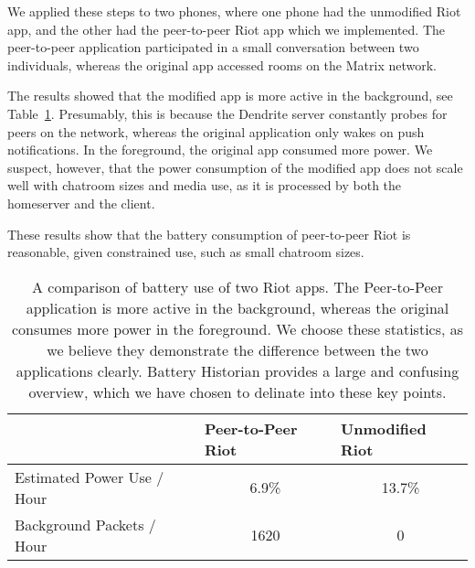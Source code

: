 We applied these steps to two phones, where one phone had the unmodified Riot app, and the other had the peer-to-peer Riot app which we implemented.
The peer-to-peer application participated in a small conversation between two individuals, whereas the original app accessed rooms on the Matrix network.

The results showed that the modified app is more active in the background, see Table~\ref{tab:battery_comparison}.
Presumably, this is because the Dendrite server constantly probes for peers on the network, whereas the original application only wakes on push notifications.
In the foreground, the original app consumed more power.
We suspect, however, that the power consumption of the modified app does not scale well with chatroom sizes and media use, as it is processed by both the homeserver and the client.

These results show that the battery consumption of peer-to-peer Riot is reasonable, given constrained use, such as small chatroom sizes.


\begin{table}[]
	\centering
	\begin{tabular}{@{}lcc@{}}
		\toprule
		                           & \multicolumn{1}{l}{\textbf{Peer-to-Peer Riot}} & \multicolumn{1}{l}{\textbf{Unmodified Riot}} \\ \midrule
		Estimated Power Use / Hour & 6.9\%                                          & 13.7\%                                       \\
		Background Packets / Hour  & 1620                                           & 0                                            \\ \bottomrule
	\end{tabular}
	\caption{
		A comparison of battery use of two Riot apps. The Peer-to-Peer application is more active in the background, whereas the original consumes more power in the foreground.
		We choose these statistics, as we believe they demonstrate the difference between the two applications clearly.
		Battery Historian provides a large and confusing overview, which we have chosen to delinate into these key points.
		}%
	\label{tab:battery_comparison}
\end{table}


